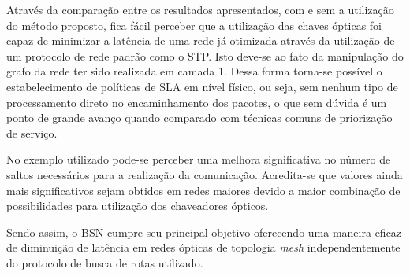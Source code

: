 \documentclass[12pt]{article}
\begin{document}
Através da comparação entre os resultados apresentados, com e sem a utilização do método proposto, fica fácil perceber que a utilização das chaves ópticas foi capaz de minimizar a latência de uma rede já otimizada através da utilização de um protocolo de rede padrão como o STP. Isto deve-se ao fato da manipulação do grafo da rede ter sido realizada em camada 1. Dessa forma torna-se possível o estabelecimento de políticas de SLA em nível físico, ou seja, sem nenhum tipo de processamento direto no encaminhamento dos pacotes, o que sem dúvida é um ponto de grande avanço quando comparado com técnicas comuns de priorização de serviço.

No exemplo utilizado pode-se perceber uma melhora significativa no número de saltos necessários para a realização da comunicação. Acredita-se que valores ainda mais significativos sejam obtidos em redes maiores devido a maior combinação de possibilidades para utilização dos chaveadores ópticos.

Sendo assim, o BSN cumpre seu principal objetivo oferecendo uma maneira eficaz de diminuição de latência em redes ópticas de topologia \emph{mesh} independentemente do protocolo de busca de rotas utilizado. 






\end{document}
